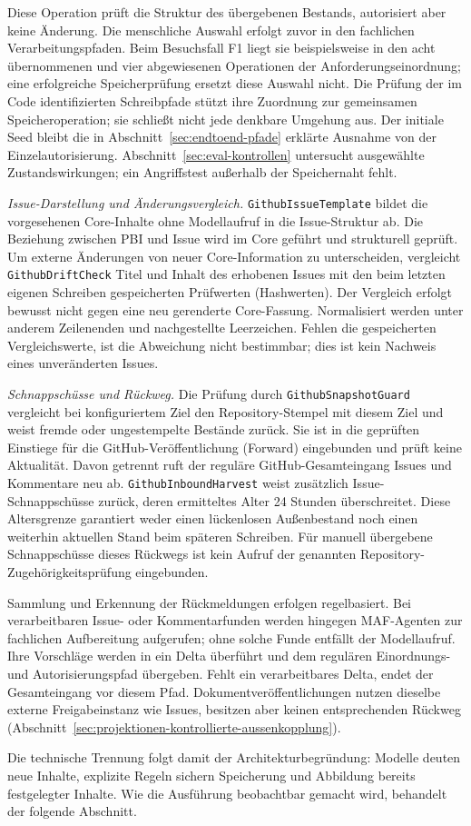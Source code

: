 Diese Operation prüft die Struktur des übergebenen Bestands,
autorisiert aber keine Änderung. Die menschliche Auswahl erfolgt
zuvor in den fachlichen Verarbeitungspfaden. Beim Besuchsfall F1
liegt sie beispielsweise in den acht übernommenen und vier
abgewiesenen Operationen der Anforderungseinordnung; eine erfolgreiche Speicherprüfung
ersetzt diese Auswahl nicht. Die Prüfung der im Code identifizierten
Schreibpfade stützt ihre Zuordnung zur gemeinsamen Speicheroperation;
sie schließt nicht jede denkbare Umgehung aus. Der initiale Seed bleibt
die in Abschnitt~\ref{sec:endtoend-pfade} erklärte Ausnahme von
der Einzelautorisierung. Abschnitt~\ref{sec:eval-kontrollen}
untersucht ausgewählte Zustandswirkungen; ein Angriffstest außerhalb
der Speichernaht fehlt.

\emph{Issue-Darstellung und Änderungsvergleich.}
\texttt{GithubIssueTemplate} bildet die vorgesehenen Core-Inhalte
ohne Modellaufruf in die Issue-Struktur ab. Die Beziehung zwischen
PBI und Issue wird im Core geführt und strukturell geprüft.
Um externe Änderungen von neuer Core-Information zu unterscheiden,
vergleicht \texttt{GithubDriftCheck} Titel und Inhalt des erhobenen
Issues mit den beim letzten eigenen Schreiben gespeicherten
Prüfwerten (Hashwerten). Der Vergleich erfolgt bewusst nicht gegen eine neu
gerenderte Core-Fassung. Normalisiert werden unter anderem
Zeilenenden und nachgestellte Leerzeichen. Fehlen die gespeicherten
Vergleichswerte, ist die Abweichung nicht bestimmbar; dies ist kein
Nachweis eines unveränderten Issues.

\emph{Schnappschüsse und Rückweg.} Die Prüfung durch
\texttt{GithubSnapshotGuard} vergleicht bei konfiguriertem Ziel
den Repository-Stempel mit diesem Ziel und weist fremde oder
ungestempelte Bestände zurück. Sie ist in die geprüften
Einstiege für die GitHub-Veröffentlichung (Forward) eingebunden
und prüft keine Aktualität.
Davon getrennt ruft der reguläre GitHub-Gesamteingang Issues und
Kommentare neu ab. \texttt{GithubInboundHarvest} weist zusätzlich
Issue-Schnappschüsse zurück, deren ermitteltes Alter 24 Stunden
überschreitet. Diese Altersgrenze garantiert weder einen lückenlosen
Außenbestand noch einen weiterhin aktuellen Stand beim späteren
Schreiben. Für manuell übergebene Schnappschüsse dieses Rückwegs
ist kein Aufruf der genannten Repository-Zugehörigkeitsprüfung
eingebunden.

Sammlung und Erkennung der Rückmeldungen erfolgen regelbasiert.
Bei verarbeitbaren Issue- oder Kommentarfunden werden hingegen
MAF-Agenten zur fachlichen Aufbereitung aufgerufen; ohne solche
Funde entfällt der Modellaufruf. Ihre Vorschläge werden in ein
Delta überführt und dem regulären Einordnungs- und
Autorisierungspfad übergeben. Fehlt ein verarbeitbares Delta,
endet der Gesamteingang vor diesem Pfad. Dokumentveröffentlichungen
nutzen dieselbe externe Freigabeinstanz wie Issues, besitzen aber
keinen entsprechenden Rückweg
(Abschnitt~\ref{sec:projektionen-kontrollierte-aussenkopplung}).

Die technische Trennung folgt damit der Architekturbegründung:
Modelle deuten neue Inhalte, explizite Regeln sichern Speicherung
und Abbildung bereits festgelegter Inhalte. Wie die Ausführung
beobachtbar gemacht wird, behandelt der folgende Abschnitt.
